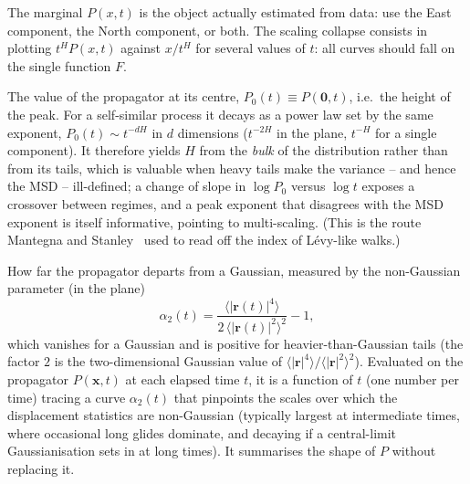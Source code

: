 \begin{description}
        The marginal $P(x,t)$ is the object actually estimated from data: use the East
        component, the North component, or both.  The
        scaling collapse consists in plotting $t^H P(x,t)$ against $x/t^H$ for several
        values of $t$: all curves should fall on the single function $F$.
  \item[Probability of return to the origin.] The value of the propagator at its centre,
        $P_0(t)\equiv P(\mathbf{0},t)$, i.e.\ the height of the peak. For a
        self-similar process it decays as a power law set by the same exponent,
        $P_0(t)\sim t^{-dH}$ in $d$ dimensions ($t^{-2H}$ in the plane, $t^{-H}$ for a single
        component). It therefore yields $H$ from the \emph{bulk} of the distribution rather
        than from its tails, which is valuable when heavy tails make the variance -- and hence
        the MSD -- ill-defined; a change of slope in $\log P_0$ versus $\log t$ exposes a
        crossover between regimes, and a peak exponent that disagrees with the MSD exponent is
        itself informative, pointing to multi-scaling. (This is the route Mantegna and Stanley~\cite{mantegna1995}
        used to read off the index of L\'evy-like walks.)
  \item[Non-Gaussianity.] How far the propagator departs from a Gaussian, measured by the
        non-Gaussian parameter (in the plane)
        \begin{equation}
          \alpha_2(t)=\frac{\big\langle|\mathbf{r}(t)|^4\big\rangle}
          {2\,\big\langle|\mathbf{r}(t)|^2\big\rangle^{2}}-1 ,
        \end{equation}
        which vanishes for a Gaussian and is positive for heavier-than-Gaussian tails (the
        factor $2$ is the two-dimensional Gaussian value of
        $\langle|\mathbf{r}|^4\rangle/\langle|\mathbf{r}|^2\rangle^{2}$). Evaluated on the
        propagator $P(\mathbf{x},t)$ at each elapsed time $t$, it is a function of $t$ (one
        number per time) tracing a curve $\alpha_2(t)$ that pinpoints the scales over which
        the displacement statistics are non-Gaussian (typically largest at intermediate
        times, where occasional long glides dominate, and decaying if a central-limit
        Gaussianisation sets in at long times). It summarises the shape of $P$ without
        replacing it.
  \item[Velocity autocorrelation $C(\tau)$.]

\end{description}
